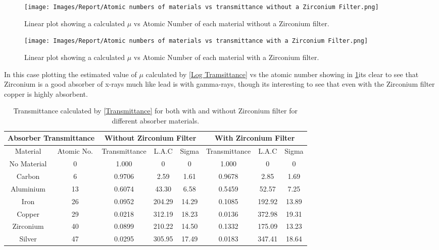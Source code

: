 \documentclass[12pt]{article}
\begin{document}
\begin{multicols}{2}
\begin{figure}[H]
\centering
\texttt{[image: Images/Report/Atomic numbers of materials vs transmittance without a Zirconium Filter.png]}
\caption{Linear plot showing a calculated $\mu$ vs Atomic Number of each material without a Zirconium filter.}
\label{Absrober 2}
\end{figure}

\begin{figure}[H]
\centering
\texttt{[image: Images/Report/Atomic numbers of materials vs transmittance with a Zirconium Filter.png]}
\caption{Linear plot showing a calculated $\mu$ vs Atomic Number of each material with a Zirconium filter.}
\label{Absorber 2}
\end{figure}
\end{multicols}

In this case plotting the estimated value of $\mu$ calculated by \cref{Log Tramsittance} vs the atomic number showing in \cref{Absorber Transmittance}its clear to see that Zirconium is a good absorber of x-rays much like lead is with gamma-rays, though its interesting to see that even with the Zirconium filter copper is highly absorbent. 

\begin{table}[H]
\begin{center}
 \footnotesize
 \begin{tabular}{|c|c||c|c|c||c|c|c|}
 \hline
 \multicolumn{2}{|c|}{Absorber Transmittance} & \multicolumn{3}{|c|}{Without Zirconium Filter} & \multicolumn{3}{|c|}{With Zirconium Filter} \\
 \hline 
 Material & Atomic No. & Transmittance & L.A.C & Sigma & Transmittance & L.A.C & Sigma \\
 \hline \hline
  No Material  & 0 & 1.000 & 0 & 0 &1.000 & 0& 0 \\
  \hline
  Carbon & 6 & 0.9706 & 2.59 & 1.61 & 0.9678 & 2.85 & 1.69 \\
 \hline 
  Aluminium  & 13 & 0.6074 & 43.30 & 6.58 & 0.5459 & 52.57 & 7.25  \\
 \hline
  Iron  & 26 & 0.0952 & 204.29 & 14.29 & 0.1085 & 192.92 & 13.89\\
 \hline 
  Copper  & 29 & 0.0218 & 312.19 & 18.23 & 0.0136 & 372.98 & 19.31\\
 \hline
  Zirconium  & 40 & 0.0899 & 210.22 & 14.50 & 0.1332 & 175.09 & 13.23  \\
 \hline 
  Silver & 47 & 0.0295 & 305.95 & 17.49 & 0.0183 & 347.41 & 18.64  \\
 \hline
 \end{tabular} \\ 
 \caption{Transmittance calculated by \cref{Transmittance} for both with and without Zirconium filter for different absorber materials.}
 \label{Absorber Transmittance}
\end{center}
\end{table}
\end{document}
